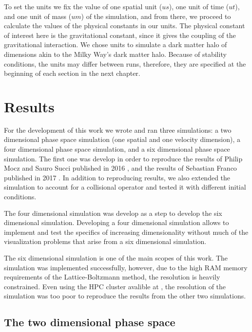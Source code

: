 To set the units we fix the value of one spatial unit ($us$), one unit of time ($ut$), and one unit of mass ($um$) of the simulation, and from there, we proceed to calculate the values of the physical constants in our units.
The physical constant of interest here is the gravitational constant, since it gives the coupling of the gravitational interaction.
We chose units to simulate a dark matter halo of dimensions akin to the Milky Way's dark matter halo. Because of stability conditions, the units may differ between runs, therefore, they are specified at the beginning of each section in the next chapter.


\chapter{Results}
For the development of this work we wrote and ran three simulations: a  two dimensional phase space simulation (one spatial and one velocity dimension), a four dimensional phase space simulation, and a six dimensional phase space simulation. 
The first one was develop in order to reproduce the results of Philip Mocz and Sauro Succi published in 2016 \cite{integerLatticeDynamics}, and the results of Sebastian Franco published in 2017 \cite{franco}.
In addition to reproducing results, we also extended the simulation to account for a collisional operator and tested it with different initial conditions.

The four dimensional simulation was develop as a step to develop the six dimensional simulation. Developing a four dimensional simulation allows to implement and test the specifics of increasing dimensionality without much of the visualization problems that arise from a six dimensional simulation. 

The six dimensional simulation is one of the main scopes of this work. The simulation was implemented successfully, however, due to the high RAM memory requirements of the Lattice-Boltzmann method, the resolution is heavily constrained. Even using the HPC cluster avalible at , the resolution of the simulation was too poor to reproduce the results from the other two simulations.

\section{The two dimensional phase space}

